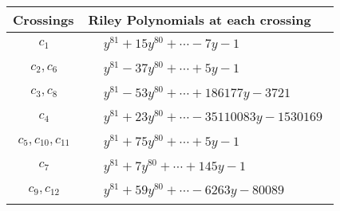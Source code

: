 \documentclass[1p]{elsarticle_modified}
\theoremstyle{definition}
\begin{document}
\begin{tabular}{m{50pt}|m{274pt}}
Crossings & \hspace{64pt}Riley Polynomials at each crossing \\
\hline $$\begin{aligned}c_{1}\end{aligned}$$&$\begin{aligned}
&y^{81}+15 y^{80}+\cdots-7 y-1
\end{aligned}$\\
\hline $$\begin{aligned}c_{2},c_{6}\end{aligned}$$&$\begin{aligned}
&y^{81}-37 y^{80}+\cdots+5 y-1
\end{aligned}$\\
\hline $$\begin{aligned}c_{3},c_{8}\end{aligned}$$&$\begin{aligned}
&y^{81}-53 y^{80}+\cdots+186177 y-3721
\end{aligned}$\\
\hline $$\begin{aligned}c_{4}\end{aligned}$$&$\begin{aligned}
&y^{81}+23 y^{80}+\cdots-35110083 y-1530169
\end{aligned}$\\
\hline $$\begin{aligned}c_{5},c_{10},c_{11}\end{aligned}$$&$\begin{aligned}
&y^{81}+75 y^{80}+\cdots+5 y-1
\end{aligned}$\\
\hline $$\begin{aligned}c_{7}\end{aligned}$$&$\begin{aligned}
&y^{81}+7 y^{80}+\cdots+145 y-1
\end{aligned}$\\
\hline $$\begin{aligned}c_{9},c_{12}\end{aligned}$$&$\begin{aligned}
&y^{81}+59 y^{80}+\cdots-6263 y-80089
\end{aligned}$\\
\hline
\end{tabular}
\vskip 2pc
\end{document}
